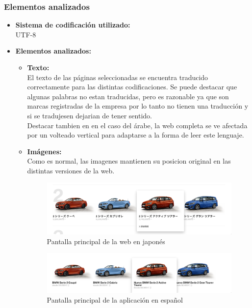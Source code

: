 \documentclass[a4paper,11pt]{article}
\begin{document}
\subsubsection{Elementos analizados}
\begin{itemize}
\item \textbf{Sistema de codificación utilizado:}\\
UTF-8
\item \textbf{Elementos analizados:}
\begin{itemize}
  \item \textbf{Texto:}\\
  El texto de las páginas seleccionadas se encuentra traducido correctamente para las distintas codificaciones. Se puede destacar que algunas palabras no estan traducidas, pero es razonable ya que son marcas registradas de la empresa por lo tanto no tienen una traducción y si se tradujesen dejarian de tener sentido.\\
  Destacar tambien en en el caso del árabe, la web completa se ve afectada por un volteado vertical para adaptarse a la forma de leer este lenguaje.

  \item \textbf{Imágenes:}\\
  Como es normal, las imagenes mantienen su posicion original en las distintas versiones de la web.

\begin{figure}[H]
  \centering
  \includegraphics[scale=0.35]{imjp.png}
  \caption{Pantalla principal de la web en japonés}
  \label{fig:imagenesjp}
\end{figure}
\begin{figure}[H]
  \centering
  \includegraphics[scale=0.35]{imsp.png}
  \caption{Pantalla principal de la aplicación en español}
  \label{fig:imagenessp}
\end{figure}



\end{itemize}
\end{itemize}
\end{document}
